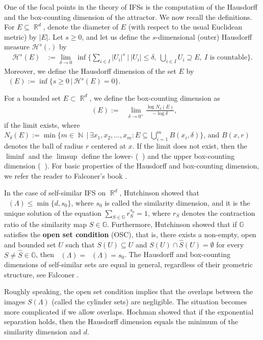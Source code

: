 \documentclass[a4paper, 11pt]{article}
\DeclareMathOperator{\N}{\mathbb{N}}
\DeclareMathOperator{\R}{\mathbb{R}}
\DeclareMathOperator{\dH}{\dim_{\mathrm{H}}}
\DeclareMathOperator{\dB}{\dim_{\mathrm{B}}}
\DeclareMathOperator{\dUB}{\overline{\dim}_{\mathrm{B}}}
\DeclareMathOperator{\dLB}{\underline{\dim}_{\mathrm{B}}}
\numberwithin{equation}{section}
\theoremstyle{plain}
\theoremstyle{remark}
\theoremstyle{definition}
\begin{document}
One of the focal points in the theory of IFSs is the computation of the Hausdorff and the box-counting dimension of the attractor. We now recall the definitions. For $E \subseteq \R^d$, denote the diameter of $E$ (with respect to the usual Euclidean metric) by $|E|$. Let $s \geq 0$, and let us define the $s$-dimensional (outer) Hausdorff measure $\mathcal{H}^s(.)$ by
\begin{align*}
\mathcal{H}^s(E) &:= \lim_{\delta \to 0}\ \inf\bigg\{ \sum_{i \in I}|U_i|^s \ \bigg|\ |U_i| \leq \delta,\ \bigcup_{i\in I}U_i \supseteq E,\ I\text{ is countable}\bigg\}.
\end{align*}
Moreover, we define the Hausdorff dimension of the set $E$ by $\dH(E) := \inf\big\{ s \geq 0 \, \big|\, \mathcal{H}^s(E) = 0 \big\}$.

For a bounded set $E \subset \R^d$, we define the box-counting dimension as
\begin{align*}
\dB(E) :=& \lim_{\delta \to 0^+}\frac{\log N_\delta(E)}{-\log\delta},
\end{align*}
if the limit exists, where $N_\delta(E) := \min\big\{m \in \N\, \big|\, \exists x_1,x_2, \dots ,x_m : E\subseteq \bigcup_{i=1}^m B(x_i, \delta)\big\} $, and $B(x, r)$ denotes the ball of radius $r$ centered at $x$. If the limit does not exist, then the $\liminf$ and the $\limsup$ define the lower- ($\dLB$) and the upper box-counting dimension ($\dUB$). For basic properties of the Hausdorff and box-counting dimension, we refer the reader to Falconer's book \cite{Falconer1990}.

In the case of self-similar IFS on $\R^d$, Hutchinson \cite{Hutchinson1981} showed that $\dUB(\Lambda)\leq\min\{d,s_0\}$, where $s_0$ is called the similarity dimension, and it is the unique solution of the equation $\sum_{S\in\mathbb{G}}r_{S}^{s_0}=1$, where $r_S$ denotes the contraction ratio of the similarity map $S\in\mathbb{G}$. Furthermore, Hutchinson showed that if $\mathbb{G}$ satisfies the \textbf{open set condition} (OSC), that is, there exists a non-empty, open and bounded set $U$ such that $S(U)\subseteq U$ and $S(U)\cap \hat{S}(U)=\emptyset$ for every $S\neq \hat{S}\in\mathbb{G}$, then $\dH(\Lambda)=\dB(\Lambda)=s_0$. The Hausdorff and box-counting dimensions of self-similar sets are equal in general, regardless of their geometric structure, see Falconer \cite{Falconer1997}.

Roughly speaking, the open set condition implies that the overlaps between the images $S(\Lambda)$ (called the cylinder sets) are negligible. The situation becomes more complicated if we allow overlaps. Hochman \cite{Hochman2014, hochman2017selfsimilarsetsoverlapsinverse} showed that if the exponential separation holds, then the Hausdorff dimension equals the minimum of the similarity dimension and $d$. 
\end{document}
